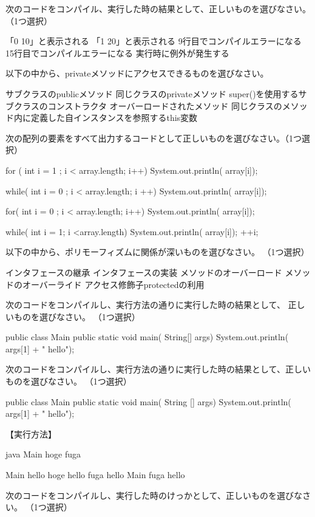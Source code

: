 \documentclass[12pt]{article}
\begin{document}

次のコードをコンパイル、実行した時の結果として、正しいものを選びなさい。（1つ選択）


「0 10」と表示される
「1 20」と表示される
9行目でコンパイルエラーになる
15行目でコンパイルエラーになる
実行時に例外が発生する


以下の中から、privateメソッドにアクセスできるものを選びなさい。

サブクラスのpublicメソッド
同じクラスのprivateメソッド
super()を使用するサブクラスのコンストラクタ
オーバーロードされたメソッド
同じクラスのメソッド内に定義した自インスタンスを参照するthis変数


次の配列の要素をすべて出力するコードとして正しいものを選びなさい。（1つ選択）


for ( int i = 1 ; i < array.length; i++){
    System.out.println( array[i]);
}

while( int i = 0 ; i < array.length; i ++){
    System.out.println( array[i]);
}

for( int i = 0 ; i < array.length; i++){
    System.out.println( array[i]);
}

while( int i = 1; i <array.length){
    System.out.println( array[i]);
    ++i;
}

以下の中から、ポリモーフィズムに関係が深いものを選びなさい。
（1つ選択）

インタフェースの継承
インタフェースの実装
メソッドのオーバーロード
メソッドのオーバーライド
アクセス修飾子protectedの利用

次のコードをコンパイルし、実行方法の通りに実行した時の結果として、
正しいものを選びなさい。
（1つ選択）

public  class Main{
    public static void main( String[] args){
        System.out.println( args[1] + " hello");
    }
}

次のコードをコンパイルし、実行方法の通りに実行した時の結果として、正しいものを選びなさい。
（1つ選択）

public class Main {
    public static void main( String [] args){
        System.out.println( args[1] + " hello");
    }
}

【実行方法】

java Main hoge fuga

Main hello
hoge hello
fuga hello
Main fuga hello


次のコードをコンパイルし、実行した時のけっかとして、正しいものを選びなさい。
（1つ選択）
\end{document}
